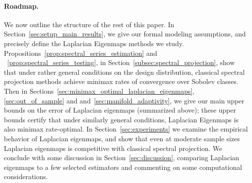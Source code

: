 \paragraph{Roadmap.}
We now outline the structure of the rest of this paper. In Section~\ref{sec:setup_main_results}, we give our formal modeling assumptions, and precisely define the Laplacian Eigenmaps methods we study. Propositions~\ref{prop:spectral_series_estimation} and ~\ref{prop:spectral_series_testing}, in Section~\ref{subsec:spectral_projection}, show that under rather general conditions on the design distribution, classical spectral projection methods achieve minimax rates of convergence over Sobolev classes. Then in Sections~\ref{sec:minimax_optimal_laplacian_eigenmaps}, \ref{sec:out_of_sample} and and~\ref{sec:manifold_adaptivity}, we give our main upper bounds on the error of Laplacian eigenmaps (summarized above); these upper bounds certify that under similarly general conditions, Laplacian Eigenmaps is also minimax rate-optimal. In Section~\ref{sec:experiments} we examine the empirical behavior of Laplacian eigenmaps, and show that even at moderate sample sizes Laplacian eigenmaps is competitive with classical spectral projection. We conclude with some discussion in Section~\ref{sec:discussion}, comparing Laplacian eigenmaps to a few selected estimators and commenting on some computational considerations.

